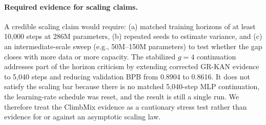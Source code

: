 \documentclass[11pt]{article}
\newcommand{\modelname}[1]{\textsc{#1}}
\newcommand{\grkan}{\modelname{GR-KAN}}
\begin{document}
\paragraph{Required evidence for scaling claims.}
A credible scaling claim would require: (a) matched training horizons of at least 10,000 steps at 286M parameters, (b) repeated seeds to estimate variance, and (c) an intermediate-scale sweep (e.g., 50M--150M parameters) to test whether the gap closes with more data or more capacity. The stabilized \(g=4\) continuation addresses part of the horizon criticism by extending corrected \grkan{} evidence to 5,040 steps and reducing validation BPB from 0.8904 to 0.8616. It does not satisfy the scaling bar because there is no matched 5,040-step MLP continuation, the learning-rate schedule was reset, and the result is still a single run. We therefore treat the ClimbMix evidence as a cautionary stress test rather than evidence for or against an asymptotic scaling law.
\end{document}
